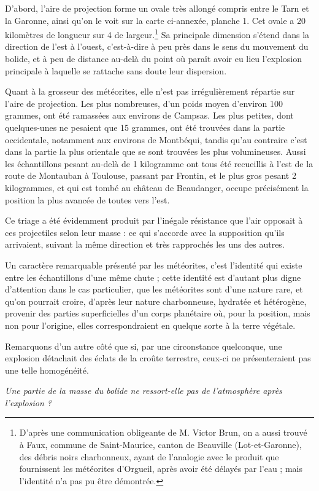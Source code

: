 \documentclass[a4paper, 11pt, oneside, polutonikogreek, french]{article}
\begin{document}
D'abord, l'aire de projection forme un ovale très allongé compris entre le Tarn et la Garonne, ainsi qu'on le voit sur la carte ci-annexée, planche 1. Cet ovale a 20 kilomètres de longueur sur 4 de largeur.\footnote{D'après une communication obligeante de M. Victor Brun, on a aussi trouvé à Faux, commune de Saint-Maurice, canton de Beauville (Lot-et-Garonne), des débris noirs charbonneux, ayant de l'analogie avec le produit que fournissent les météorites d'Orgueil, après avoir été délayés par l'eau ; mais l'identité n'a pas pu être démontrée.} Sa principale dimension s'étend dans la direction de l'est à l'ouest, c'est-à-dire à peu près dans le sens du mouvement du bolide, et à peu de distance au-delà du point où paraît avoir eu lieu l'explosion principale à laquelle se rattache sans doute leur dispersion.

Quant à la grosseur des météorites, elle n'est pas irrégulièrement répartie sur l'aire de projection. Les plus nombreuses, d'un poids moyen d'environ 100 grammes, ont été ramassées aux environs de Campsas. Les plus petites, dont quelques-unes ne pesaient que 15 grammes, ont été trouvées dans la partie occidentale, notamment aux environs de Montbéqui, tandis qu'au contraire c'est dans la partie la plus orientale que se sont trouvées les plus volumineuses. Aussi les échantillons pesant au-delà de 1 kilogramme ont tous été recueillis à l'est de la route de Montauban à Toulouse, passant par Frontin, et le plus gros pesant 2 kilogrammes, et qui est tombé au château de Beaudanger, occupe précisément la position la plus avancée de toutes vers l'est.

Ce triage a été évidemment produit par l'inégale résistance que l'air opposait à ces projectiles selon leur masse : ce qui s'accorde avec la supposition qu'ils arrivaient, suivant la même direction et très rapprochés les uns des autres.

Un caractère remarquable présenté par les météorites, c'est l'identité qui existe entre les échantillons d'une même chute ; cette identité est d'autant plus digne d'attention dans le cas particulier, que les météorites sont d'une nature rare, et qu'on pourrait croire, d'après leur nature charbonneuse, hydratée et hétérogène, provenir des parties superficielles d'un corps planétaire où, pour la position, mais non pour l'origine, elles correspondraient en quelque sorte à la terre végétale.

Remarquons d'un autre côté que si, par une circonstance quelconque, une explosion détachait des éclats de la croûte terrestre, ceux-ci ne présenteraient pas une telle homogénéité.
\begin{center}
\emph{Une partie de la masse du bolide ne ressort-elle pas de l'atmosphère après l'explosion ?}
\end{center}
\end{document}
